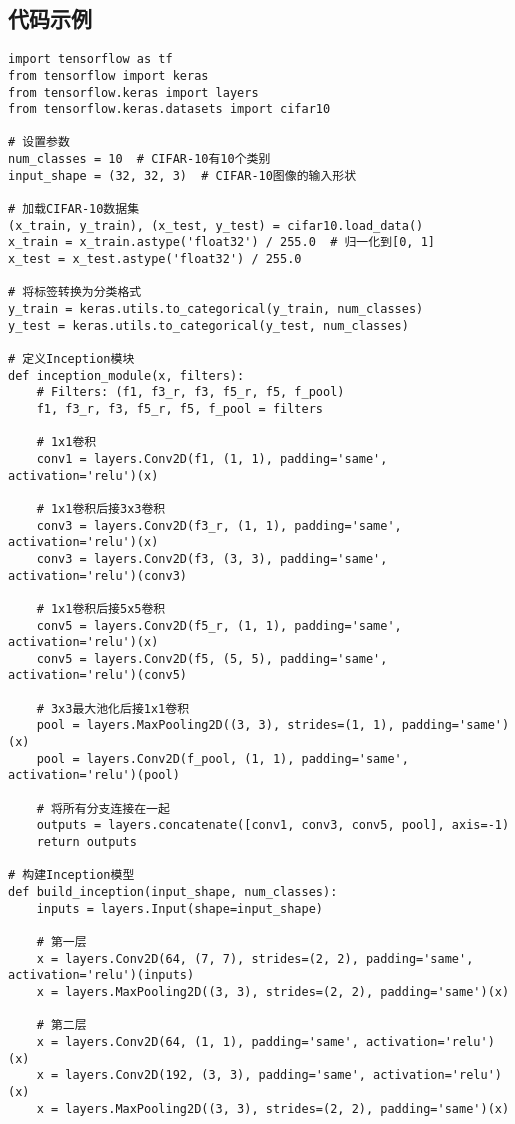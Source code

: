 \subsection*{代码示例}
\begin{lstlisting}
import tensorflow as tf
from tensorflow import keras
from tensorflow.keras import layers
from tensorflow.keras.datasets import cifar10

# 设置参数
num_classes = 10  # CIFAR-10有10个类别
input_shape = (32, 32, 3)  # CIFAR-10图像的输入形状

# 加载CIFAR-10数据集
(x_train, y_train), (x_test, y_test) = cifar10.load_data()
x_train = x_train.astype('float32') / 255.0  # 归一化到[0, 1]
x_test = x_test.astype('float32') / 255.0

# 将标签转换为分类格式
y_train = keras.utils.to_categorical(y_train, num_classes)
y_test = keras.utils.to_categorical(y_test, num_classes)

# 定义Inception模块
def inception_module(x, filters):
    # Filters: (f1, f3_r, f3, f5_r, f5, f_pool)
    f1, f3_r, f3, f5_r, f5, f_pool = filters

    # 1x1卷积
    conv1 = layers.Conv2D(f1, (1, 1), padding='same', activation='relu')(x)

    # 1x1卷积后接3x3卷积
    conv3 = layers.Conv2D(f3_r, (1, 1), padding='same', activation='relu')(x)
    conv3 = layers.Conv2D(f3, (3, 3), padding='same', activation='relu')(conv3)

    # 1x1卷积后接5x5卷积
    conv5 = layers.Conv2D(f5_r, (1, 1), padding='same', activation='relu')(x)
    conv5 = layers.Conv2D(f5, (5, 5), padding='same', activation='relu')(conv5)

    # 3x3最大池化后接1x1卷积
    pool = layers.MaxPooling2D((3, 3), strides=(1, 1), padding='same')(x)
    pool = layers.Conv2D(f_pool, (1, 1), padding='same', activation='relu')(pool)

    # 将所有分支连接在一起
    outputs = layers.concatenate([conv1, conv3, conv5, pool], axis=-1)
    return outputs

# 构建Inception模型
def build_inception(input_shape, num_classes):
    inputs = layers.Input(shape=input_shape)

    # 第一层
    x = layers.Conv2D(64, (7, 7), strides=(2, 2), padding='same', activation='relu')(inputs)
    x = layers.MaxPooling2D((3, 3), strides=(2, 2), padding='same')(x)

    # 第二层
    x = layers.Conv2D(64, (1, 1), padding='same', activation='relu')(x)
    x = layers.Conv2D(192, (3, 3), padding='same', activation='relu')(x)
    x = layers.MaxPooling2D((3, 3), strides=(2, 2), padding='same')(x)


\end{lstlisting}
